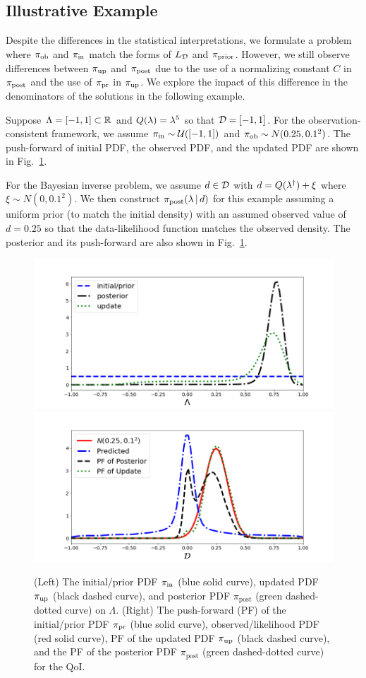 \subsection{Illustrative Example}
Despite the differences in the statistical interpretations, we formulate a problem where $\operatorname*{\pi_{ob}}$ and $\operatorname*{\pi_{in}}$ match the forms of $L_{\mathcal{D}}$ and $\operatorname*{\pi_{prior}}$.
However, we still observe differences between $\operatorname*{\pi_{up}}$ and $\operatorname*{\pi_{post}}$ due to the use of a normalizing constant $C$ in $\operatorname*{\pi_{post}}$ and the use of $\operatorname*{\pi_{pr}}$ in $\operatorname*{\pi_{up}}$.
We explore the impact of this difference in the denominators of the solutions in the following example.



\begin{ex}
Suppose ${\Lambda} = [-1,1]\subset\mathbb{R}$ and $Q(\lambda)=\lambda^5$ so that $\mathcal{D} = [-1,1]$.
For the observation-consistent framework, we assume $\operatorname*{\pi_{in}}\sim \mathcal{U}([-1,1])$ and $\operatorname*{\pi_{ob}}\sim N(0.25,0.1^2)$.
The push-forward of initial PDF, the observed PDF, and the updated PDF are shown in Fig.~\ref{fig:bayes-comparison}.

For the Bayesian inverse problem, we assume $d\in \mathcal{D}$ with $d=Q(\lambda^\dagger)+\xi$ where $\xi\sim N(0,0.1^2)$.
We then construct $\pi_{\text{post}}(\lambda \, |\, d)$ for this example assuming a uniform prior (to match the initial density) with an assumed observed value of $d=0.25$ so that the data-likelihood function matches the observed density.
The posterior and its push-forward are also shown in Fig.~\ref{fig:bayes-comparison}.


\begin{figure}[htbp]
\centering
   \includegraphics[width=0.49\linewidth]{figures/bip-vs-sip-1.png}
   \includegraphics[width=0.49\linewidth]{figures/bip-vs-sip-pf-1.png}
 \caption{(Left) The initial/prior PDF $\operatorname*{\pi_{in}}$ (blue solid curve), updated PDF $\operatorname*{\pi_{up}}$ (black dashed curve), and posterior PDF $\pi_\text{post}$ (green dashed-dotted curve) on $\Lambda$.
 (Right) The push-forward (PF) of the initial/prior PDF $\operatorname*{\pi_{pr}}$ (blue solid curve), observed/likelihood PDF (red solid curve), PF of the updated PDF $\operatorname*{\pi_{up}}$ (black dashed curve), and the PF of the posterior PDF $\pi_\text{post}$ (green dashed-dotted curve) for the QoI.}
 \label{fig:bayes-comparison}
\end{figure}



\end{ex}
